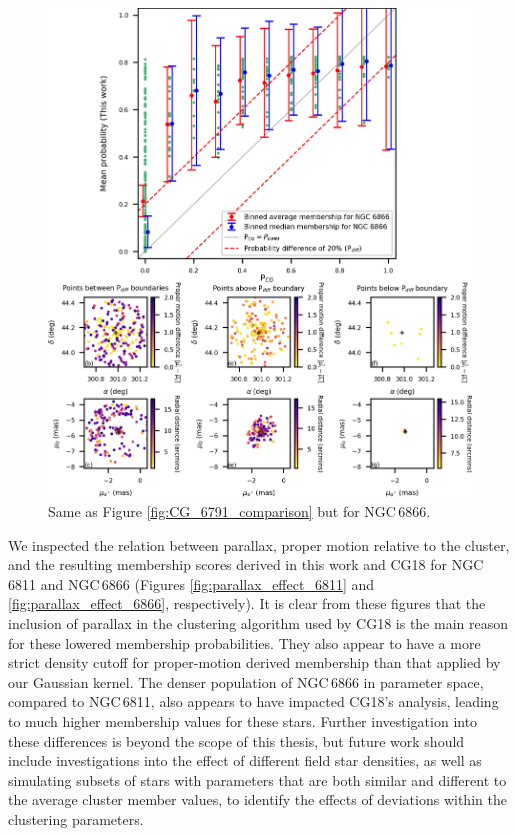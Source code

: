 \begin{figure}[hbtp]
    \centering
    \includegraphics[width=\linewidth]{Chapter4/NGC6866_CG_comparison.png}
    \caption[Comparison of membership probabilities for NGC\,6866]{Same as Figure \ref{fig:CG_6791_comparison} but for NGC\,6866.}
    \label{fig:CG_6866_comparison}
\end{figure}

We inspected the relation between parallax, proper motion relative to the cluster, and the resulting membership scores derived in this work and CG18 for NGC\,6811 and NGC\,6866 (Figures \ref{fig:parallax_effect_6811} and \ref{fig:parallax_effect_6866}, respectively). It is clear from these figures that the inclusion of parallax in the clustering algorithm used by CG18 is the main reason for these lowered membership probabilities. They also appear to have a more strict density cutoff for proper-motion derived membership than that applied by our Gaussian kernel. The denser population of NGC\,6866 in parameter space, compared to NGC\,6811, also appears to have impacted CG18's analysis, leading to much higher membership values for these stars. Further investigation into these differences is beyond the scope of this thesis, but future work should include investigations into the effect of different field star densities, as well as simulating subsets of stars with parameters that are both similar and different to the average cluster member values, to identify the effects of deviations within the clustering parameters.

